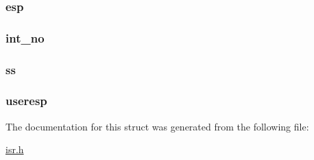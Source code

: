 \label{structregisters_a031d176a324992b1ef7c3b7335383590}
\hypertarget{structregisters_a7c8cdb0e23278dc958565ee9a5ebb14b}{
\subsubsection[{esp}]{ {\bf esp}}}
\label{structregisters_a7c8cdb0e23278dc958565ee9a5ebb14b}
\hypertarget{structregisters_a43eb1111b811b27ece63da7c761004f2}{
\subsubsection[{int\_\-no}]{ {\bf int\_\-no}}}
\label{structregisters_a43eb1111b811b27ece63da7c761004f2}
\hypertarget{structregisters_a2d24d5fa0b7085227a24aef88db016f3}{
\subsubsection[{ss}]{ {\bf ss}}}
\label{structregisters_a2d24d5fa0b7085227a24aef88db016f3}
\hypertarget{structregisters_a33d89c6cf55cb45b65ef912e9deff07e}{
\subsubsection[{useresp}]{ {\bf useresp}}}
\label{structregisters_a33d89c6cf55cb45b65ef912e9deff07e}


The documentation for this struct was generated from the following file:\begin{DoxyCompactItemize}
\item 
\hyperlink{isr_8h}{isr.h}\end{DoxyCompactItemize}

